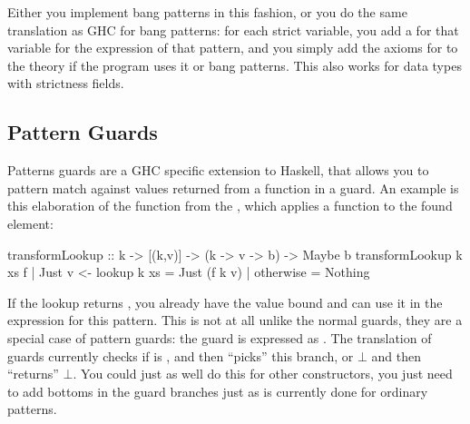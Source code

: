 Either you implement bang patterns in this fashion, or you do the same
translation as GHC for bang patterns: for each strict variable, you
add a  for that variable for the expression of that pattern,
and you simply add the axioms for  to the theory if the
program uses it or bang patterns. This also works for data types with
strictness fields.

\subsection{Pattern Guards}

Patterns guards are a GHC specific extension to Haskell, that allows
you to pattern match against values returned from a function in a
guard. An example is this elaboration of the  function from
the , which applies a function to the found element:

\begin{code}
transformLookup :: k -> [(k,v)] -> (k -> v -> b) -> Maybe b
transformLookup k xs f | Just v <- lookup k xs = Just (f k v)
                       | otherwise             = Nothing
\end{code}

\noindent
If the lookup returns , you already have the value 
bound and can use it in the expression for this pattern. This is not
at all unlike the normal guards, they are a special case of pattern
guards: the guard  is expressed as
. The translation of guards currently checks if
 is , and then ``picks'' this branch, or $\bot$ and
then ``returns'' $\bot$. You could just as well do this for other
constructors, you just need to add bottoms in the guard branches just
as is currently done for ordinary patterns.

